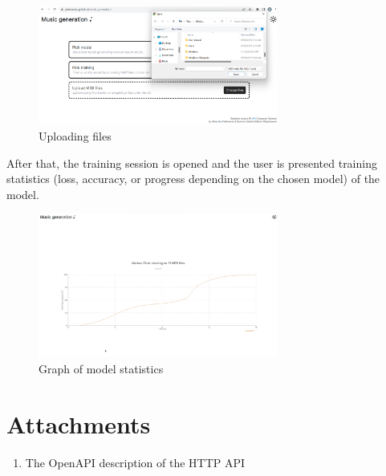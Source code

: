 \documentclass{article}
\begin{document}
\begin{figure}[H]
    \centering
    \includegraphics[width=0.7\textwidth]{assets/app3.png}
    \caption{Uploading files}
\end{figure}

After that, the training session is opened and the user is presented training statistics (loss, accuracy, or progress depending on the chosen model) of the model.

\begin{figure}[H]
    \centering
    \includegraphics[width=0.7\textwidth]{assets/app4.png}
    \caption{Graph of model statistics}
\end{figure}
\newpage
\section{Attachments}

\begin{enumerate}
    \item \label{att:openapi} The OpenAPI description of the HTTP API
\end{enumerate}


\printbibliography
\end{document}
